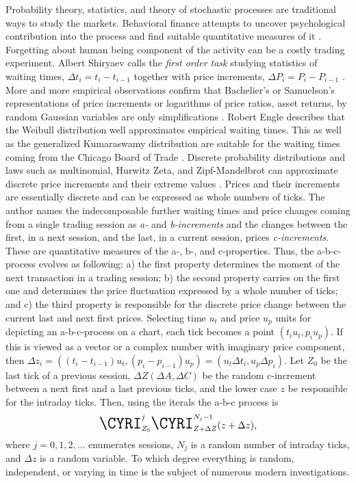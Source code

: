 \documentclass{article}
\begin{document}
Probability theory, statistics, and theory of stochastic processes are traditional ways to study the markets. Behavioral finance attempts to uncover psychological contribution into the process and find suitable quantitative measures of it \cite{tversky}. Forgetting about human being component of the activity can be a costly trading experiment. Albert Shiryaev calls the \textit{first order task} studying statistics of waiting times, $\Delta t_i = t_{i} - t_{i-1}$ together with price increments, $\Delta P_i = P_{i} - P_{i-1}$ \cite[p. 379 of Russian edition]{shiryaev}. More and more empirical observations confirm that Bachelier's or Samuelson's representations of price increments or logarithms of price ratios, asset returns, by random Gaussian variables are only simplifications \cite{salov}. Robert Engle describes \cite{engle} that the Weibull \cite{weibull} distribution well approximates empirical waiting times. This as well as the generalized Kumaraswamy distribution \cite{kumaraswamy} are suitable for the waiting times coming from the Chicago Board of Trade \cite{salov}. Discrete probability distributions and laws such as multinomial, Hurwitz Zeta, and Zipf-Mandelbrot can approximate discrete price increments and their extreme values \cite{salov}. Prices and their increments are essentially discrete and can be expressed as whole numbers of ticks. The author names the indecomposable further waiting times and price changes coming from a single trading session as \textit{a-} and \textit{b-increments} and the changes between the first, in a next session, and the last, in a current session, prices \textit{c-increments}. These are quantitative measures of the a-, b-, and c-properties. Thus, the a-b-c-process evolves as following: a) the first property determines the moment of the next transaction in a trading session; b) the second property carries on the first one and determines the price fluctuation expressed by a whole number of ticks; and c) the third property is responsible for the discrete price change between the current last and next first prices. Selecting time $u_t$ and price $u_p$ units for depicting an a-b-c-process on a chart, each tick becomes a point $(t_i{u_t}, p_i{u_p})$. If this is viewed as a vector or a complex number with imaginary price component, then $\Delta z_i = ((t_i - t_{i - 1})u_t, (p_i - p_{i - 1})u_p) = (u_t \Delta t_i, u_p \Delta p_i)$. Let $Z_0$ be the last tick of a previous session, $\Delta Z(\Delta A, \Delta C)$ be the random c-increment between a next first and a last previous ticks, and the lower case $z$ be responsible for the intraday ticks. Then, using the iterals the a-b-c process is
\begin{displaymath}
\textrm{\LARGE{\CYRI}}_{Z_0}^{j} \textrm{\LARGE{\CYRI}}_{Z + \Delta Z}^{N_j - 1}(z + \Delta z),  
\end{displaymath}
where $j = 0, 1, 2, \ldots$ enumerates sessions, $N_j$ is a random number of intraday ticks, and $\Delta z$ is a random variable. To which degree everything is random, independent, or varying in time is the subject of numerous modern investigations.
 
\end{document}

